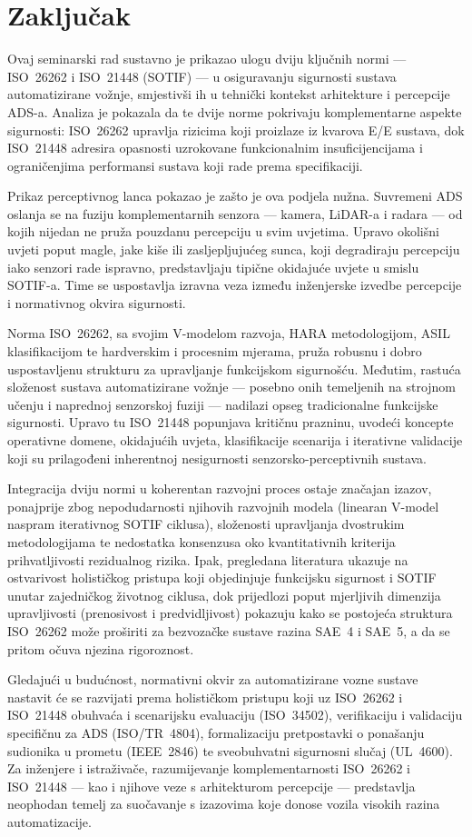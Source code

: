 \section{Zaključak}
\label{sec:zakljucak}

Ovaj seminarski rad sustavno je prikazao ulogu dviju ključnih normi — ISO~26262 i ISO~21448 (SOTIF) — u osiguravanju sigurnosti sustava automatizirane vožnje, smjestivši ih u tehnički kontekst arhitekture i percepcije ADS-a. Analiza je pokazala da te dvije norme pokrivaju komplementarne aspekte sigurnosti: ISO~26262 upravlja rizicima koji proizlaze iz kvarova E/E sustava, dok ISO~21448 adresira opasnosti uzrokovane funkcionalnim insuficijencijama i ograničenjima performansi sustava koji rade prema specifikaciji.

Prikaz perceptivnog lanca pokazao je zašto je ova podjela nužna. Suvremeni ADS oslanja se na fuziju komplementarnih senzora — kamera, LiDAR-a i radara — od kojih nijedan ne pruža pouzdanu percepciju u svim uvjetima. Upravo okolišni uvjeti poput magle, jake kiše ili zasljepljujućeg sunca, koji degradiraju percepciju iako senzori rade ispravno, predstavljaju tipične okidajuće uvjete u smislu SOTIF-a. Time se uspostavlja izravna veza između inženjerske izvedbe percepcije i normativnog okvira sigurnosti.

Norma ISO~26262, sa svojim V-modelom razvoja, HARA metodologijom, ASIL klasifikacijom te hardverskim i procesnim mjerama, pruža robusnu i dobro uspostavljenu strukturu za upravljanje funkcijskom sigurnošću. Međutim, rastuća složenost sustava automatizirane vožnje — posebno onih temeljenih na strojnom učenju i naprednoj senzorskoj fuziji — nadilazi opseg tradicionalne funkcijske sigurnosti. Upravo tu ISO~21448 popunjava kritičnu prazninu, uvodeći koncepte operativne domene, okidajućih uvjeta, klasifikacije scenarija i iterativne validacije koji su prilagođeni inherentnoj nesigurnosti senzorsko-perceptivnih sustava.

Integracija dviju normi u koherentan razvojni proces ostaje značajan izazov, ponajprije zbog nepodudarnosti njihovih razvojnih modela (linearan V-model naspram iterativnog SOTIF ciklusa), složenosti upravljanja dvostrukim metodologijama te nedostatka konsenzusa oko kvantitativnih kriterija prihvatljivosti rezidualnog rizika. Ipak, pregledana literatura ukazuje na ostvarivost holističkog pristupa koji objedinjuje funkcijsku sigurnost i SOTIF unutar zajedničkog životnog ciklusa, dok prijedlozi poput mjerljivih dimenzija upravljivosti (prenosivost i predvidljivost) pokazuju kako se postojeća struktura ISO~26262 može proširiti za bezvozačke sustave razina SAE~4 i SAE~5, a da se pritom očuva njezina rigoroznost.

Gledajući u budućnost, normativni okvir za automatizirane vozne sustave nastavit će se razvijati prema holističkom pristupu koji uz ISO~26262 i ISO~21448 obuhvaća i scenarijsku evaluaciju (ISO~34502), verifikaciju i validaciju specifičnu za ADS (ISO/TR~4804), formalizaciju pretpostavki o ponašanju sudionika u prometu (IEEE~2846) te sveobuhvatni sigurnosni slučaj (UL~4600). Za inženjere i istraživače, razumijevanje komplementarnosti ISO~26262 i ISO~21448 — kao i njihove veze s arhitekturom percepcije — predstavlja neophodan temelj za suočavanje s izazovima koje donose vozila visokih razina automatizacije.
